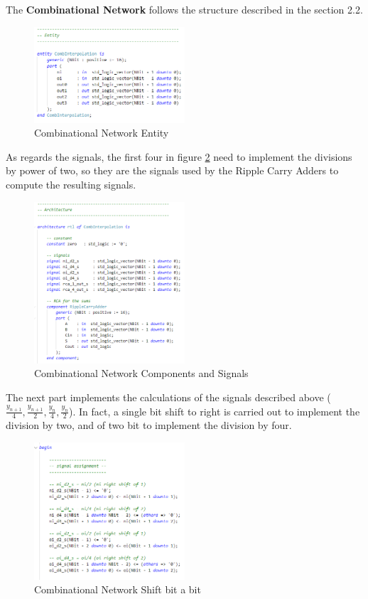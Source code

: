 The \textbf{Combinational Network} follows the structure described in the section 2.2.

\begin{figure}[H]
    \centering
    \includegraphics[width=0.5\textwidth]{img/Chapter3/CombInterp-entity.png}
    \caption{Combinational Network Entity}
    \label{fig:CNE}
\end{figure}

As regards the signals, the first four in figure \ref{fig:CNA1} need to implement the divisions by power of two, so they are the signals used by the Ripple Carry Adders to compute the resulting signals.

\begin{figure}[H]
    \centering
    \includegraphics[width=0.5\textwidth]{img/Chapter3/CombInterp-architecture.png}
    \caption{Combinational Network Components and Signals}
    \label{fig:CNA1}
\end{figure}

The next part implements the calculations of the signals described above ($\frac{y_{n+1}}{4}, \frac{y_{n+1}}{2}, \frac{y_n}{4}, \frac{y_n}{2}$). In fact, a single bit shift to right is carried  out to implement the division by two, and of two bit to implement the division by four.

\begin{figure}[H]
    \centering
    \includegraphics[width=0.5\textwidth]{img/Chapter3/CombInterp-shift.png}
    \caption{Combinational Network Shift bit a bit}
    \label{fig:CNA2}
\end{figure}

